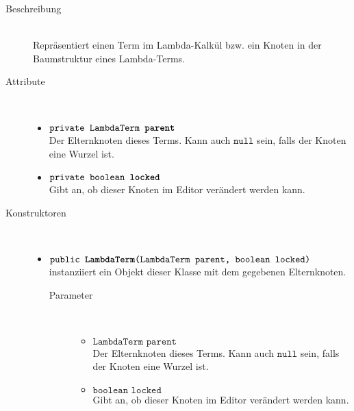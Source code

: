 \begin{description}
\item[Beschreibung] \hfill \\ Repräsentiert einen Term im Lambda-Kalkül bzw. ein Knoten in der Baumstruktur eines Lambda-Terms.

\item[Attribute] \hfill \\
	\vspace{-.8cm}
	\begin{itemize}
		\item $\texttt{private LambdaTerm \textbf{parent}}$ \\ Der Elternknoten dieses Terms. Kann auch $\texttt{null}$ sein, falls der Knoten eine Wurzel ist.
		\item $\texttt{private boolean \textbf{locked}}$ \\ Gibt an, ob dieser Knoten im Editor verändert werden kann.
	\end{itemize}
	
\item[Konstruktoren] \hfill \\
	\vspace{-.8cm}
	\begin{itemize}
		\item $\texttt{public \textbf{LambdaTerm}(LambdaTerm parent, boolean locked)}$ \\ instanziiert ein Objekt dieser Klasse mit dem gegebenen Elternknoten.
		\begin{description}
			\item[Parameter] \hfill \\
			\vspace{-.8cm}
			\begin{itemize}
				\item $\texttt{LambdaTerm parent}$ \\ Der Elternknoten dieses Terms. Kann auch $\texttt{null}$ sein, falls der Knoten eine Wurzel ist.
				\item $\texttt{boolean locked}$ \\ Gibt an, ob dieser Knoten im Editor verändert werden kann.
			\end{itemize}
		\end{description}
	\end{itemize}
	

\end{description}
